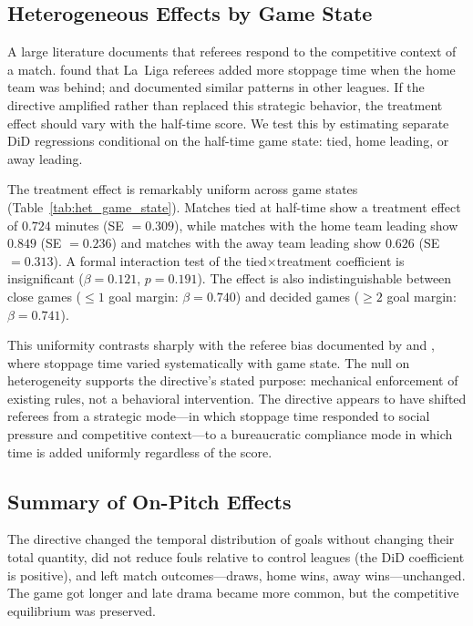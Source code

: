 \documentclass[12pt]{article}
\begin{document}
\subsection{Heterogeneous Effects by Game State}
\label{subsec:het_game_state}

A large literature documents that referees respond to the competitive context of a match. \citet{garicano2005favoritism} found that La~Liga referees added more stoppage time when the home team was behind; \citet{dohmen2008professionals} and \citet{bekes2024favoritism} documented similar patterns in other leagues. If the directive amplified rather than replaced this strategic behavior, the treatment effect should vary with the half-time score. We test this by estimating separate DiD regressions conditional on the half-time game state: tied, home leading, or away leading.



The treatment effect is remarkably uniform across game states (Table~\ref{tab:het_game_state}). Matches tied at half-time show a treatment effect of $0.724$ minutes (SE $= 0.309$), while matches with the home team leading show $0.849$ (SE $= 0.236$) and matches with the away team leading show $0.626$ (SE $= 0.313$). A formal interaction test of the tied$\times$treatment coefficient is insignificant ($\beta = 0.121$, $p = 0.191$). The effect is also indistinguishable between close games ($\leq 1$ goal margin: $\beta = 0.740$) and decided games ($\geq 2$ goal margin: $\beta = 0.741$).

This uniformity contrasts sharply with the referee bias documented by \citet{garicano2005favoritism} and \citet{dohmen2008professionals}, where stoppage time varied systematically with game state. The null on heterogeneity supports the directive's stated purpose: mechanical enforcement of existing rules, not a behavioral intervention. The directive appears to have shifted referees from a strategic mode---in which stoppage time responded to social pressure and competitive context---to a bureaucratic compliance mode in which time is added uniformly regardless of the score.


\subsection{Summary of On-Pitch Effects}



The directive changed the temporal distribution of goals without changing their total quantity, did not reduce fouls relative to control leagues (the DiD coefficient is positive), and left match outcomes---draws, home wins, away wins---unchanged. The game got longer and late drama became more common, but the competitive equilibrium was preserved.
\end{document}
